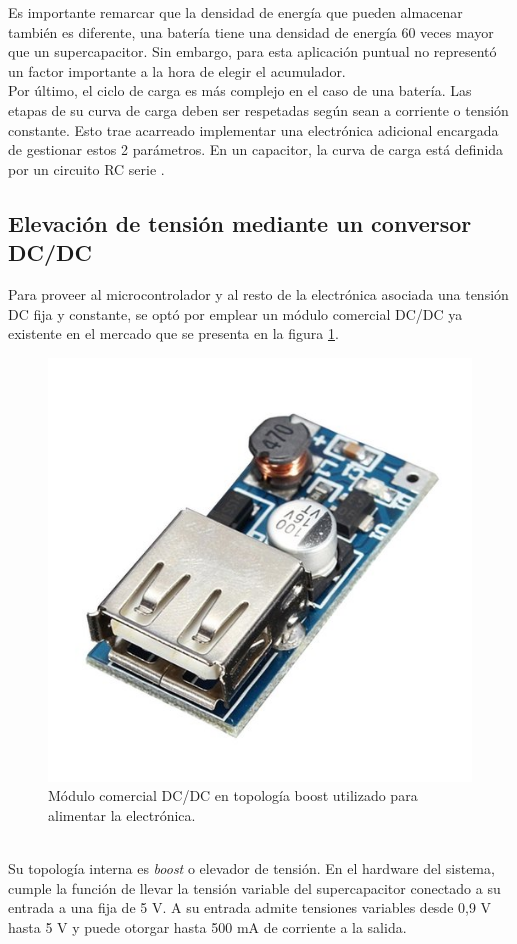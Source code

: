 Es importante remarcar que la densidad de energía que pueden almacenar también es diferente, una batería tiene una densidad de energía 60 veces mayor que un supercapacitor. Sin embargo, para esta aplicación puntual no representó un factor importante a la hora de elegir el acumulador.\\
Por último, el ciclo de carga es más complejo en el caso de una batería. Las etapas de su curva de carga deben ser respetadas según sean a corriente o tensión constante. Esto trae acarreado implementar una electrónica adicional encargada de gestionar estos 2 parámetros. En un capacitor, la curva de carga está definida por un circuito RC serie \citep{ceraolo2014fundamentals}.\\ 

\subsection{Elevación de tensión mediante un conversor DC/DC }
Para proveer al microcontrolador y al resto de la electrónica asociada una tensión DC fija y constante, se optó por emplear un módulo comercial DC/DC ya existente en el mercado que se presenta en la figura \ref{fig:dcdcboost}.\\
\begin{figure}[h!]
	\centering
	\includegraphics[width=0.4\linewidth]{Figures/dcdc_boost}
	\caption{Módulo comercial DC/DC en topología boost utilizado para alimentar la electrónica.}
	\label{fig:dcdcboost}
\end{figure}\\
Su topología interna es \textit{boost} o elevador de tensión. En el hardware del sistema, cumple la función de llevar la tensión variable del supercapacitor conectado a su entrada a una fija de 5 V. 
A su entrada admite tensiones variables desde 0,9 V hasta 5 V y puede otorgar hasta 500 mA de corriente a la salida.

